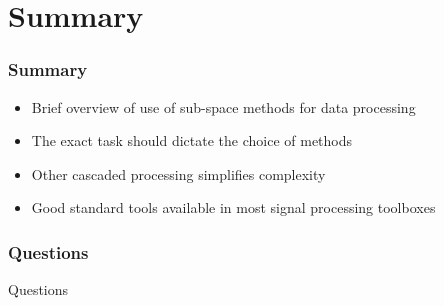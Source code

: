 \documentclass[10pt]{beamer}
\begin{document}
\section{Summary}
\label{sec:summary}

\begin{frame}
  \frametitle{Summary}
  \begin{itemize}
  \item Brief overview of use of sub-space methods for data processing
  \item The exact task should dictate the choice of methods
  \item Other cascaded processing simplifies complexity
  \item Good standard tools available in most signal processing toolboxes
  \end{itemize}
\end{frame}

\begin{frame}
  \frametitle{Questions}
  \centerline{\Huge Questions}
\end{frame}
\end{document}
